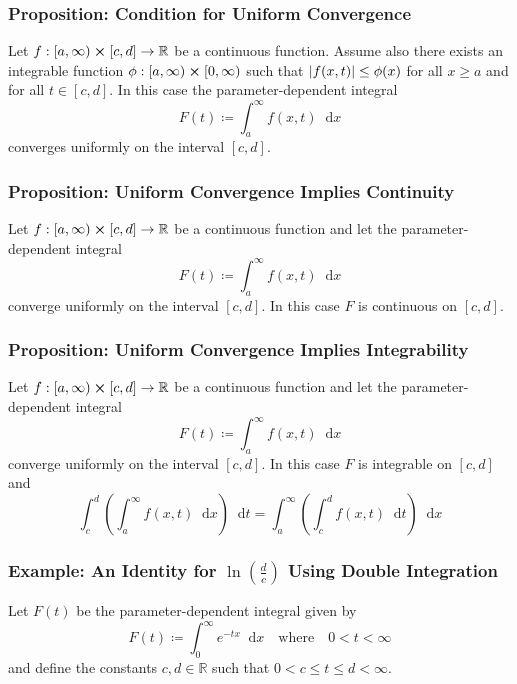 \documentclass[11pt, a4paper]{article}
\newcommand{\diff}{\mathop{}\!\mathrm{d}} %
\begin{document}
\subsubsection{Proposition: Condition for Uniform Convergence}
Let $ f: [a, \infty) \cross [c, d] \rightarrow \mathbb{R}$ be a continuous function. Assume also there exists an integrable function $ \phi : [a, \infty) \cross [0, \infty) $ such that $ \abs{f(x, t)} \leq \phi(x) $ for all $ x \geq a  $ and for all $  t \in [c, d] $. In this case the parameter-dependent integral
\begin{equation*}
	F(t) \coloneqq \int_{a}^{\infty} f(x, t) \diff x
\end{equation*}
converges uniformly on the interval $ [c, d] $.

\subsubsection{Proposition: Uniform Convergence Implies Continuity}
Let $ f: [a, \infty) \cross [c, d] \rightarrow \mathbb{R}$ be a continuous function and let the parameter-dependent integral
\begin{equation*}
	F(t) \coloneqq \int_{a}^{\infty} f(x, t) \diff x
\end{equation*}
converge uniformly on the interval $ [c, d] $. In this case $ F $ is continuous on $ [c, d] $.

\subsubsection{Proposition: Uniform Convergence Implies Integrability}
Let $ f: [a, \infty) \cross [c, d] \rightarrow \mathbb{R}$ be a continuous function and let the parameter-dependent integral
\begin{equation*}
	F(t) \coloneqq \int_{a}^{\infty} f(x, t) \diff x
\end{equation*}
converge uniformly on the interval $ [c, d] $. In this case $ F $ is integrable on $ [c, d] $ and
\begin{equation*}
\int_{c}^{d}\left(\int_{a}^{\infty} f(x, t) \diff x\right) \diff t = \int_{a}^{\infty}\left(\int_{c}^{d} f(x, t) \diff t\right) \diff x
\end{equation*}


\subsubsection{Example: An Identity for $ \ln(\frac{d}{c}) $ Using Double Integration} 
Let $ F(t) $ be the parameter-dependent integral given by
\begin{equation*}
	F(t) \coloneqq \int_{0}^{\infty} e^{-tx} \diff x \quad \text{where} \quad 0 < t < \infty
\end{equation*}
and define the constants $ c, d \in \mathbb{R} $ such that $ 0 < c \leq t \leq d < \infty $. 
\end{document}
